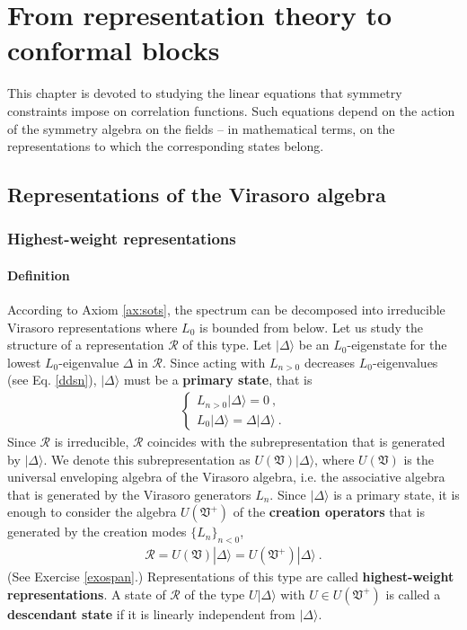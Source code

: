 \documentclass[12pt, a4paper, notitlepage, twoside]{report}
\numberwithin{equation}{section}
\theoremstyle{break}
\begin{document}
\chapter{From representation theory to conformal blocks \label{secccs}}

This chapter is devoted to studying the linear equations that symmetry constraints impose on correlation functions.
Such equations depend on the action of the symmetry algebra on the fields -- in mathematical terms, on the representations to which the corresponding states belong. 

\section{Representations of the Virasoro algebra \label{secrep}}

\subsection{Highest-weight representations}

\subsubsection{Definition}

According to Axiom \ref{ax:sots}, the spectrum can be decomposed into irreducible Virasoro representations where $L_0$ is bounded from below. 
Let us study the structure of a representation $\mathcal{R}$ of this type. 
Let $|\Delta\rangle$ be an $L_0$-eigenstate for the lowest $L_0$-eigenvalue $\Delta$ in $\mathcal{R}$.
Since acting with $L_{n>0}$ decreases $L_0$-eigenvalues (see Eq. \eqref{ddsn}), $|\Delta\rangle$ must be a \textbf{\boldmath primary state}, that is
\begin{align}
 \boxed{\left\{\begin{array}{l}  L_{n>0}|\Delta\rangle = 0\ , \\ L_0 |\Delta\rangle = \Delta |\Delta\rangle\ .\end{array}\right. }
\label{lvlv}
\end{align}
Since $\mathcal{R}$ is irreducible, $\mathcal{R}$ coincides with the subrepresentation that is generated by $|\Delta\rangle$. We denote this subrepresentation as $U(\mathfrak{V})|\Delta\rangle$, where $U(\mathfrak{V})$ is the universal enveloping algebra of the Virasoro algebra, i.e. the associative algebra that is generated by the Virasoro generators $L_n$.
Since $|\Delta\rangle$ is a primary state, it is enough to consider the algebra $U(\mathfrak{V}^+)$ of the \textbf{\boldmath creation operators} that is generated by the creation modes $\{L_n\}_{n<0}$, 
\begin{align}
 \mathcal{R} = U(\mathfrak{V})|\Delta\rangle =U(\mathfrak{V}^+)|\Delta\rangle\ .
\label{ruv}
\end{align}
(See Exercise \ref{exospan}.)
Representations of this type are called \textbf{\boldmath highest-weight representations}.
A state of $\mathcal{R}$ of the type $U|\Delta\rangle$ with $U\in U(\mathfrak{V}^+)$ is called a \textbf{\boldmath descendant state} if it is linearly independent from $|\Delta\rangle$.
\end{document}
